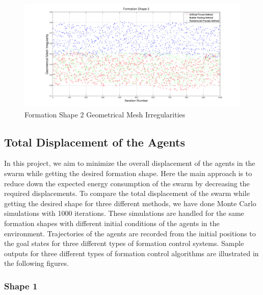 \begin{figure}[H]
\caption{Formation Shape 2 Geometrical Mesh Irregularities} \label{geometric_ref_2}
\centerline{\includegraphics[scale = 0.32]{Geometrical_Irr_2}}
\end{figure} 	
		
\subsection{Total Displacement of the Agents}  \label{total_dist_ref}
		
In this project, we aim to minimize the overall displacement of the agents in the swarm while getting the desired formation shape. Here the main approach is to reduce down the expected energy consumption of the swarm by decreasing the required displacements. To compare the total displacement of the swarm while getting the desired shape for three different methods, we have done Monte Carlo simulations with 1000 iterations. These simulations are handled for the same formation shapes with different initial conditions of the agents in the environment. Trajectories of the agents are recorded from the initial positions to the goal states for three different types of formation control systems. Sample outputs for three different types of formation control algorithms are illustrated in the following figures.
		
\newpage
\subsubsection{Shape 1}\hspace{0pt} \\
		
